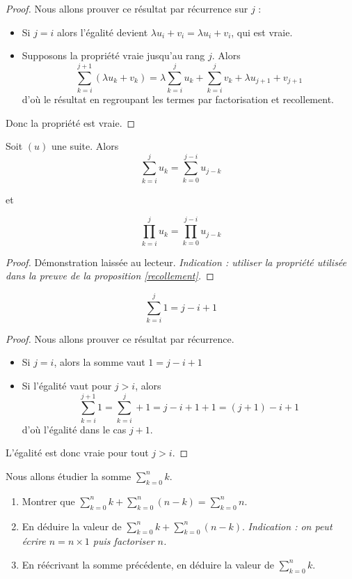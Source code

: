 \begin{proof}
    Nous allons prouver ce résultat par récurrence sur $j$ :
    \begin{itemize}[label=$\bullet$]
        \item Si $j=i$ alors l'égalité devient $\lambda u_i+v_i = \lambda u_i + v_i$, qui est vraie.
        \item Supposons la propriété vraie jusqu'au rang $j$. Alors $$\sum_{k=i}^{j+1} (\lambda u_k + v_k) = \lambda \sum_{k=i}^j u_k + \sum_{k=i}^j v_k + \lambda u_{j+1} + v_{j+1}$$ d'où le résultat en regroupant les termes par factorisation et recollement.
    \end{itemize}
    Donc la propriété est vraie.
\end{proof}

\begin{prop}
    Soit $(u)$ une suite. Alors $$\sum_{k=i}^j u_k = \sum_{k=0}^{j-i} u_{j-k}$$ \begin{center} et \end{center} $$\prod_{k=i}^j u_k = \prod_{k=0}^{j-i} u_{j-k}$$
\end{prop}
\begin{proof}
    Démonstration laissée au lecteur. \textit{Indication : utiliser la propriété utilisée dans la preuve de la proposition \ref{recollement}.}
\end{proof}

\begin{prop}
    $$\sum_{k=i}^j 1=j-i+1$$
\end{prop}
\begin{proof}
    Nous allons prouver ce résultat par récurrence.
    \begin{itemize}[label=$\bullet$]
        \item Si $j=i$, alors la somme vaut $1=j-i+1$
        \item Si l'égalité vaut pour $j > i$, alors $$\sum_{k=i}^{j+1} 1 = \sum_{k=i}^j + 1 = j-i+1+1=(j+1)-i+1$$
        d'où l'égalité dans le cas $j+1$.
    \end{itemize}
    L'égalité est donc vraie pour tout $j>i$.
\end{proof}

\begin{exo}
    Nous allons étudier la somme $\sum_{k=0}^n k$.
    \begin{enumerate}
        \item Montrer que $\sum_{k=0}^n k + \sum_{k=0}^n (n-k)=\sum_{k=0}^n n$.
        \item En déduire la valeur de $\sum_{k=0}^n k + \sum_{k=0}^n (n-k)$. \textit{Indication : on peut écrire $n=n\times 1$ puis factoriser $n$.}
        \item En réécrivant la somme précédente, en déduire la valeur de $\sum_{k=0}^n k$.
    \end{enumerate}
\end{exo}

